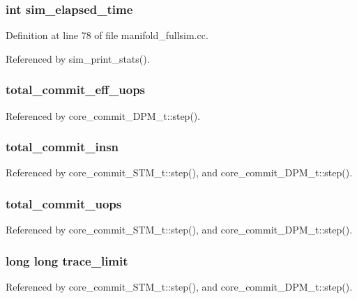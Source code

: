\subsubsection[{sim\_\-elapsed\_\-time}]{\setlength{\rightskip}{0pt plus 5cm}int {\bf sim\_\-elapsed\_\-time}}\label{zesto-opts_8h_84462569a8ea1951d2547b98eaa30f25}




Definition at line 78 of file manifold\_\-fullsim.cc.

Referenced by sim\_\-print\_\-stats().
\subsubsection[{total\_\-commit\_\-eff\_\-uops}]{ {\bf total\_\-commit\_\-eff\_\-uops}}\label{zesto-opts_8h_bab3d62fd7bff25cd7429ee135d4dc3d}




Referenced by core\_\-commit\_\-DPM\_\-t::step().
\subsubsection[{total\_\-commit\_\-insn}]{ {\bf total\_\-commit\_\-insn}}\label{zesto-opts_8h_171eaf944329f4e388ce310836b483e9}




Referenced by core\_\-commit\_\-STM\_\-t::step(), and core\_\-commit\_\-DPM\_\-t::step().
\subsubsection[{total\_\-commit\_\-uops}]{ {\bf total\_\-commit\_\-uops}}\label{zesto-opts_8h_6c3a3c20b2532043566ce7c55105a880}




Referenced by core\_\-commit\_\-STM\_\-t::step(), and core\_\-commit\_\-DPM\_\-t::step().
\subsubsection[{trace\_\-limit}]{\setlength{\rightskip}{0pt plus 5cm}long long {\bf trace\_\-limit}}\label{zesto-opts_8h_7f085ab1f80062bcfa4b9086e934c007}




Referenced by core\_\-commit\_\-STM\_\-t::step(), and core\_\-commit\_\-DPM\_\-t::step().